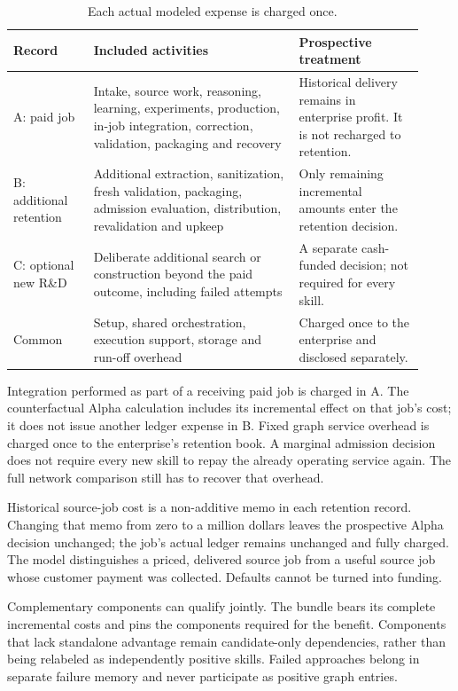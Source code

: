 \documentclass[11pt,letterpaper]{article}
\begin{document}
\begin{table}[H]\centering\small
\caption{Each actual modeled expense is charged once.}\label{tab:books}
\begin{tabular}{p{0.18\linewidth}p{0.46\linewidth}p{0.28\linewidth}}\toprule
Record & Included activities & Prospective treatment\\\midrule
A: paid job & Intake, source work, reasoning, learning, experiments, production, in-job integration, correction, validation, packaging and recovery & Historical delivery remains in enterprise profit. It is not recharged to retention.\\
B: additional retention & Additional extraction, sanitization, fresh validation, packaging, admission evaluation, distribution, revalidation and upkeep & Only remaining incremental amounts enter the retention decision.\\
C: optional new R\&D & Deliberate additional search or construction beyond the paid outcome, including failed attempts & A separate cash-funded decision; not required for every skill.\\
Common & Setup, shared orchestration, execution support, storage and run-off overhead & Charged once to the enterprise and disclosed separately.\\\bottomrule
\end{tabular}
\end{table}

Integration performed as part of a receiving paid job is charged in A. The
counterfactual Alpha calculation includes its incremental effect on that job's
cost; it does not issue another ledger expense in B. Fixed graph service overhead
is charged once to the enterprise's retention book. A marginal admission decision
does not require every new skill to repay the already operating service again.
The full network comparison still has to recover that overhead.

Historical source-job cost is a non-additive memo in each retention record.
Changing that memo from zero to a million dollars leaves the prospective Alpha
decision unchanged; the job's actual ledger remains unchanged and fully charged.
The model distinguishes a priced, delivered source job from a useful source job
whose customer payment was collected. Defaults cannot be turned into funding.

Complementary components can qualify jointly. The bundle bears its complete
incremental costs and pins the components required for the benefit. Components
that lack standalone advantage remain candidate-only dependencies, rather than
being relabeled as independently positive skills. Failed approaches belong in
separate failure memory and never participate as positive graph entries.
\end{document}
